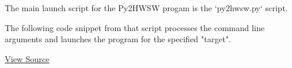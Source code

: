 %

The main launch script for the Py2HWSW progam is the `py2hwsw.py` script.

The following code snippet from that script processes the command line arguments and launches the program for the specified "target".


\href{https://github.com/IObundle/py2hwsw/blob/main/py2hwsw/scripts/py2hwsw.py}{View Source}


